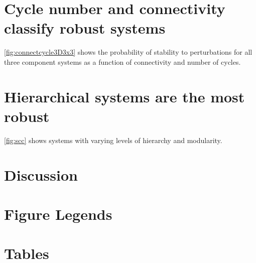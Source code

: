 \section{Cycle number and connectivity classify robust systems}
\ref{fig:connectcycle3D3x3} shows the probability of stability to perturbations for all three component systems as a function of connectivity and number of cycles.

\section{Hierarchical systems are the most robust}
\ref{fig:scc} shows systems with varying levels of hierarchy and modularity.

\section{Discussion}

\newpage




\newpage
\FloatBarrier

\section{Figure Legends}


\newpage
\FloatBarrier

\section{Tables}


% 



